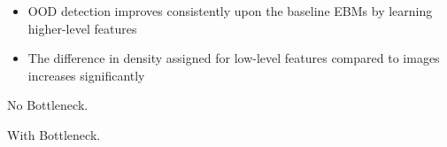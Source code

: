 \documentclass[landscape,a0paper,fontscale=0.30]{baposter}
\begin{document}
\begin{poster}
{\begin{minipage}[t]{.48\linewidth}
        \begin{itemize}
            \item OOD detection improves consistently upon the baseline EBMs by learning higher-level features
            \item The difference in density assigned for low-level features compared to images increases significantly
        \end{itemize}
        \vspace{1.7em}
        \begin{minipage}[b]{0.5\linewidth}
            \begin{center}
            No Bottleneck.
            \end{center}
        \end{minipage}%
        \hfill
        \begin{minipage}[b]{0.5\linewidth}
            \begin{center}
            With Bottleneck.
            \end{center}
        \end{minipage}
    \end{minipage}%
    \vspace{-1.5em}
}


\end{poster}
\end{document}
